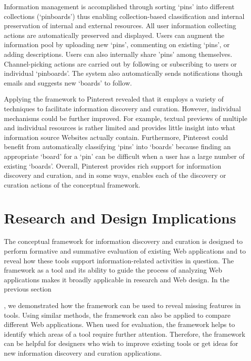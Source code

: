 \documentclass{sigchi}
\newcommand{\feature}[1]{{\ttfamily#1}}
\begin{document}
{{Information management is accomplished through sorting `pins' into different collections (`pinboards') thus enabling \feature{collection-based classification} and \feature{internal preservation of internal and external resources}. All user information collecting actions are \feature{automatically} preserved and displayed. Users can augment the information pool by uploading new `pins', commenting on existing `pins', or adding descriptions. Users can also \feature{internally share} 'pins' among themselves. Channel-picking actions are carried out by following or \feature{subscribing} to users or individual `pinboards'. The system also \feature{automatically} sends \feature{notifications} though emails and \feature{suggests} new `boards' to follow.

Applying the framework to Pinterest revealed that it employs a  variety of techniques to facilitate information discovery and curation. However, individual mechanisms could be further improved. For example, \feature{textual previews} of multiple and individual resources is rather limited and provides little insight into what information source Websites actually contain. Furthermore, Pinterest could benefit from \feature{automatically classifying} `pins' into `boards' because finding an appropriate `board' for a `pin' can be difficult when a user has a large number of existing `boards'. Overall, Pinterest provides rich support for information discovery and curation, and in some ways, enables each of the discovery or curation actions of the conceptual framework. 
} %

\section{Research and Design Implications}
\label{section:implications}
The conceptual framework for information discovery and curation is designed to perform formative and summative evaluation of existing Web applications and to reveal how these tools support information-related activities in question. The framework as a tool and its ability to guide the process of analyzing Web applications makes it broadly applicable in research and Web design. 
\balance
In the previous section}, we demonstrated how the framework can be used to reveal missing features in tools. Using similar methods, the framework can also be applied to compare different Web applications. When used for evaluation, the framework helps to identify which areas of a tool require further attention. Therefore, the framework can be helpful for designers who wish to improve existing tools or get ideas for new information discovery and curation applications. 
\end{document}

